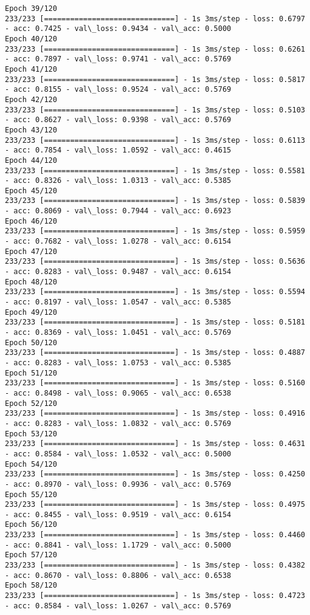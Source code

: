\documentclass[11pt]{article}
\begin{document}
\begin{Verbatim}[commandchars=\\\{\}]
Epoch 39/120
233/233 [==============================] - 1s 3ms/step - loss: 0.6797 - acc: 0.7425 - val\_loss: 0.9434 - val\_acc: 0.5000
Epoch 40/120
233/233 [==============================] - 1s 3ms/step - loss: 0.6261 - acc: 0.7897 - val\_loss: 0.9741 - val\_acc: 0.5769
Epoch 41/120
233/233 [==============================] - 1s 3ms/step - loss: 0.5817 - acc: 0.8155 - val\_loss: 0.9524 - val\_acc: 0.5769
Epoch 42/120
233/233 [==============================] - 1s 3ms/step - loss: 0.5103 - acc: 0.8627 - val\_loss: 0.9398 - val\_acc: 0.5769
Epoch 43/120
233/233 [==============================] - 1s 3ms/step - loss: 0.6113 - acc: 0.7854 - val\_loss: 1.0592 - val\_acc: 0.4615
Epoch 44/120
233/233 [==============================] - 1s 3ms/step - loss: 0.5581 - acc: 0.8326 - val\_loss: 1.0313 - val\_acc: 0.5385
Epoch 45/120
233/233 [==============================] - 1s 3ms/step - loss: 0.5839 - acc: 0.8069 - val\_loss: 0.7944 - val\_acc: 0.6923
Epoch 46/120
233/233 [==============================] - 1s 3ms/step - loss: 0.5959 - acc: 0.7682 - val\_loss: 1.0278 - val\_acc: 0.6154
Epoch 47/120
233/233 [==============================] - 1s 3ms/step - loss: 0.5636 - acc: 0.8283 - val\_loss: 0.9487 - val\_acc: 0.6154
Epoch 48/120
233/233 [==============================] - 1s 3ms/step - loss: 0.5594 - acc: 0.8197 - val\_loss: 1.0547 - val\_acc: 0.5385
Epoch 49/120
233/233 [==============================] - 1s 3ms/step - loss: 0.5181 - acc: 0.8369 - val\_loss: 1.0451 - val\_acc: 0.5769
Epoch 50/120
233/233 [==============================] - 1s 3ms/step - loss: 0.4887 - acc: 0.8283 - val\_loss: 1.0753 - val\_acc: 0.5385
Epoch 51/120
233/233 [==============================] - 1s 3ms/step - loss: 0.5160 - acc: 0.8498 - val\_loss: 0.9065 - val\_acc: 0.6538
Epoch 52/120
233/233 [==============================] - 1s 3ms/step - loss: 0.4916 - acc: 0.8283 - val\_loss: 1.0832 - val\_acc: 0.5769
Epoch 53/120
233/233 [==============================] - 1s 3ms/step - loss: 0.4631 - acc: 0.8584 - val\_loss: 1.0532 - val\_acc: 0.5000
Epoch 54/120
233/233 [==============================] - 1s 3ms/step - loss: 0.4250 - acc: 0.8970 - val\_loss: 0.9936 - val\_acc: 0.5769
Epoch 55/120
233/233 [==============================] - 1s 3ms/step - loss: 0.4975 - acc: 0.8455 - val\_loss: 0.9519 - val\_acc: 0.6154
Epoch 56/120
233/233 [==============================] - 1s 3ms/step - loss: 0.4460 - acc: 0.8841 - val\_loss: 1.1729 - val\_acc: 0.5000
Epoch 57/120
233/233 [==============================] - 1s 3ms/step - loss: 0.4382 - acc: 0.8670 - val\_loss: 0.8806 - val\_acc: 0.6538
Epoch 58/120
233/233 [==============================] - 1s 3ms/step - loss: 0.4723 - acc: 0.8584 - val\_loss: 1.0267 - val\_acc: 0.5769

\end{Verbatim}
\end{document}
